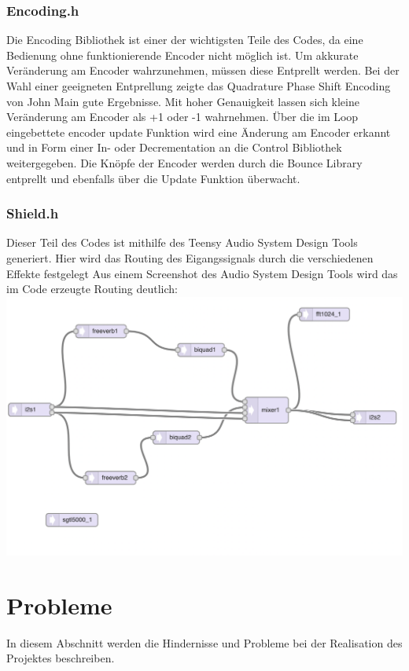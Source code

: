 \documentclass[12pt]{article}
\begin{document}
\subsubsection{Encoding.h}
Die Encoding Bibliothek ist einer der wichtigsten Teile des Codes, da eine Bedienung ohne funktionierende Encoder nicht möglich ist. Um akkurate Veränderung am Encoder wahrzunehmen, 
müssen diese Entprellt werden. Bei der Wahl einer geeigneten Entprellung zeigte das Quadrature Phase Shift Encoding von John Main gute Ergebnisse. Mit hoher Genauigkeit lassen sich 
kleine Veränderung am Encoder als +1 oder -1 wahrnehmen. Über die im Loop eingebettete encoder update Funktion wird eine Änderung am Encoder erkannt und in Form einer In- oder Decrementation an die Control 
Bibliothek weitergegeben. Die Knöpfe der Encoder werden durch die Bounce Library entprellt und ebenfalls über die Update Funktion überwacht.   
\subsubsection{Shield.h}
Dieser Teil des Codes ist mithilfe des Teensy Audio System Design Tools generiert. Hier wird das Routing des Eigangssignals durch die verschiedenen Effekte festgelegt 
Aus einem Screenshot des Audio System Design Tools wird das im Code erzeugte Routing deutlich:
\\
\includegraphics[width=\textwidth]{AudioDesignTool}

\newpage
\section{Probleme}
In diesem Abschnitt werden die Hindernisse und Probleme bei der Realisation des Projektes beschreiben.
\end{document}
